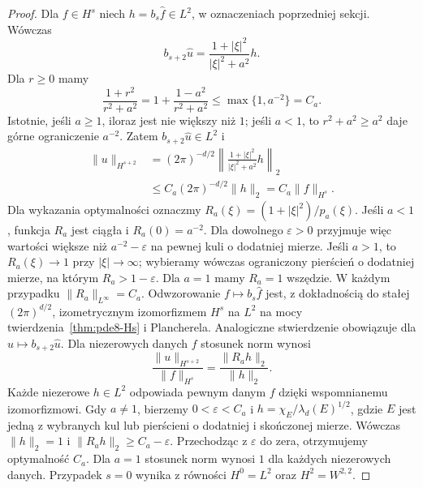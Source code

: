 \begin{proof}
Dla $f\in H^s$ niech $h=b_s\widehat f\in L^2$,
w oznaczeniach poprzedniej sekcji.
Wówczas
\[
 b_{s+2}\widehat u
 =\frac{1+|\xi|^2}{|\xi|^2+a^2}h.
\]
Dla $r\ge0$ mamy
\[
 \frac{1+r^2}{r^2+a^2}
 =1+\frac{1-a^2}{r^2+a^2}
 \le\max\{1,a^{-2}\}=C_a.
\]
Istotnie, jeśli $a\ge1$, iloraz jest nie większy
niż $1$; jeśli $a<1$, to $r^2+a^2\ge a^2$
daje górne ograniczenie $a^{-2}$.
Zatem $b_{s+2}\widehat u\in L^2$ i
\[
 \begin{aligned}
 \|u\|_{H^{s+2}}
 &=(2\pi)^{-d/2}
 \left\|\frac{1+|\xi|^2}{|\xi|^2+a^2}h\right\|_2\\
 &\le C_a(2\pi)^{-d/2}\|h\|_2
 =C_a\|f\|_{H^s}.
 \end{aligned}
\]
Dla wykazania optymalności oznaczmy
$R_a(\xi)=(1+|\xi|^2)/p_a(\xi)$.
Jeśli $a<1$, funkcja $R_a$ jest ciągła
i $R_a(0)=a^{-2}$. Dla dowolnego
$\varepsilon>0$ przyjmuje więc wartości
większe niż $a^{-2}-\varepsilon$
na pewnej kuli o dodatniej mierze.
Jeśli $a>1$, to $R_a(\xi)\to1$
przy $|\xi|\to\infty$; wybieramy wówczas
ograniczony pierścień o dodatniej mierze,
na którym $R_a>1-\varepsilon$.
Dla $a=1$ mamy $R_a=1$ wszędzie.
W każdym przypadku
$\|R_a\|_{L^\infty}=C_a$.
Odwzorowanie $f\mapsto b_s\widehat f$
jest, z dokładnością do stałej $(2\pi)^{d/2}$,
izometrycznym izomorfizmem $H^s$ na $L^2$
na mocy twierdzenia~\ref{thm:pde8-Hs}
i Plancherela. Analogiczne stwierdzenie
obowiązuje dla $u\mapsto b_{s+2}\widehat u$.
Dla niezerowych danych $f$ stosunek norm wynosi
\[
 \frac{\|u\|_{H^{s+2}}}{\|f\|_{H^s}}
 =\frac{\|R_a h\|_2}{\|h\|_2}.
\]
Każde niezerowe $h\in L^2$ odpowiada pewnym
danym $f$ dzięki wspomnianemu izomorfizmowi.
Gdy $a\ne1$, bierzemy $0<\varepsilon<C_a$
i $h=\chi_E/\lambda_d(E)^{1/2}$, gdzie $E$
jest jedną z wybranych kul lub pierścieni
o dodatniej i skończonej mierze.
Wówczas $\|h\|_2=1$ i $\|R_a h\|_2\ge
C_a-\varepsilon$. Przechodząc z $\varepsilon$
do zera, otrzymujemy optymalność $C_a$.
Dla $a=1$ stosunek norm wynosi $1$ dla
każdych niezerowych danych.
Przypadek $s=0$ wynika z równości $H^0=L^2$
oraz $H^2=W^{2,2}$.
\end{proof}

